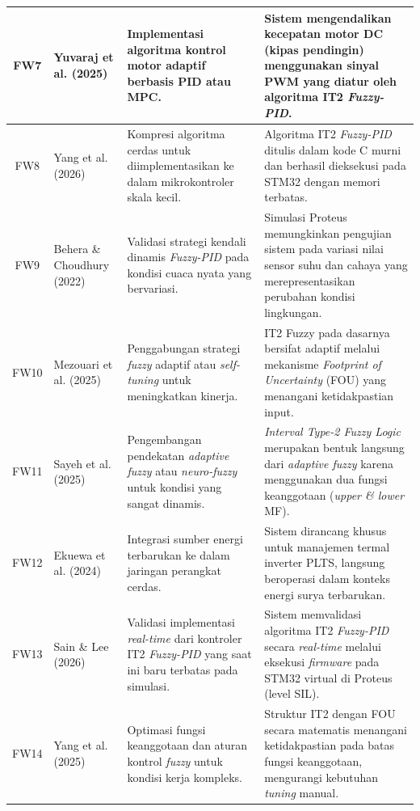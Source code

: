 \documentclass[11pt,a4paper]{article}
\begin{document}
\begin{footnotesize}
\begin{longtable}{|c|p{3.2cm}|p{6cm}|p{4.8cm}|}
FW7 & Yuvaraj et al. (2025) & Implementasi algoritma kontrol motor adaptif berbasis PID atau MPC. & Sistem mengendalikan kecepatan motor DC (kipas pendingin) menggunakan sinyal PWM yang diatur oleh algoritma IT2 \textit{Fuzzy-PID}. \\
\hline

FW8 & Yang et al. (2026) & Kompresi algoritma cerdas untuk diimplementasikan ke dalam mikrokontroler skala kecil. & Algoritma IT2 \textit{Fuzzy-PID} ditulis dalam kode C murni dan berhasil dieksekusi pada STM32 dengan memori terbatas. \\
\hline

FW9 & Behera \& Choudhury (2022) & Validasi strategi kendali dinamis \textit{Fuzzy-PID} pada kondisi cuaca nyata yang bervariasi. & Simulasi Proteus memungkinkan pengujian sistem pada variasi nilai sensor suhu dan cahaya yang merepresentasikan perubahan kondisi lingkungan. \\
\hline

FW10 & Mezouari et al. (2025) & Penggabungan strategi \textit{fuzzy} adaptif atau \textit{self-tuning} untuk meningkatkan kinerja. & IT2 Fuzzy pada dasarnya bersifat adaptif melalui mekanisme \textit{Footprint of Uncertainty} (FOU) yang menangani ketidakpastian input. \\
\hline

FW11 & Sayeh et al. (2025) & Pengembangan pendekatan \textit{adaptive fuzzy} atau \textit{neuro-fuzzy} untuk kondisi yang sangat dinamis. & \textit{Interval Type-2 Fuzzy Logic} merupakan bentuk langsung dari \textit{adaptive fuzzy} karena menggunakan dua fungsi keanggotaan (\textit{upper \& lower} MF). \\
\hline

FW12 & Ekuewa et al. (2024) & Integrasi sumber energi terbarukan ke dalam jaringan perangkat cerdas. & Sistem dirancang khusus untuk manajemen termal inverter PLTS, langsung beroperasi dalam konteks energi surya terbarukan. \\
\hline

FW13 & Sain \& Lee (2026) & Validasi implementasi \textit{real-time} dari kontroler IT2 \textit{Fuzzy-PID} yang saat ini baru terbatas pada simulasi. & Sistem memvalidasi algoritma IT2 \textit{Fuzzy-PID} secara \textit{real-time} melalui eksekusi \textit{firmware} pada STM32 virtual di Proteus (level SIL). \\
\hline

FW14 & Yang et al. (2025) & Optimasi fungsi keanggotaan dan aturan kontrol \textit{fuzzy} untuk kondisi kerja kompleks. & Struktur IT2 dengan FOU secara matematis menangani ketidakpastian pada batas fungsi keanggotaan, mengurangi kebutuhan \textit{tuning} manual. \\
\hline


\end{longtable}
\end{footnotesize}
\end{document}
